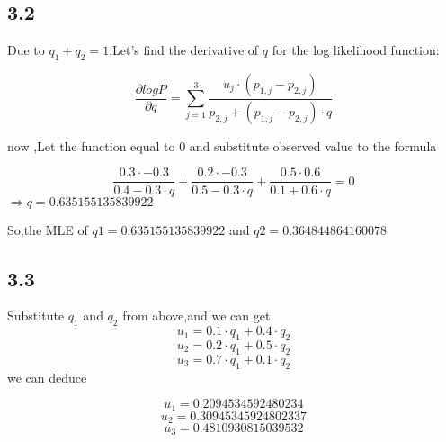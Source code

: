 \documentclass[a4paper,12pt]{article}
\begin{document}
\subsection*{3.2}
Due to $q_{1} + q_2 = 1$,Let's find the derivative of $q$ for the log likelihood function:



$$\frac{\partial logP}{\partial q} = \sum\limits_{j=1}^{3}\frac{u_j \cdot (p_{1,j}-p_{2,j})}{p_{2,j} + (p_{1,j}-p_{2,j}) \cdot q}$$

now ,Let the function equal to 0 and substitute observed value to the formula

$$ \frac{0.3 \cdot -0.3}{0.4 - 0.3 \cdot q}+\frac{0.2 \cdot -0.3}{0.5 - 0.3 \cdot q}+\frac{0.5\cdot0.6}{0.1 + 0.6 \cdot q} = 0 $$
$\Longrightarrow q = 0.635155135839922$





So,the MLE of $q1 =  0.635155135839922 $ and $q2 = 0.364844864160078 $

\subsection*{3.3}
Substitute $q_1$ and $q_2$ from above,and we can get
$$u_1 = 0.1\cdot q_1 + 0.4 \cdot q_2$$
$$u_2 = 0.2\cdot q_1 + 0.5 \cdot q_2$$
$$u_3 = 0.7\cdot q_1 + 0.1 \cdot q_2$$
we can deduce

$$u_1= 0.2094534592480234$$
$$u_2= 0.30945345924802337$$
$$u_3= 0.4810930815039532$$
\end{document}
